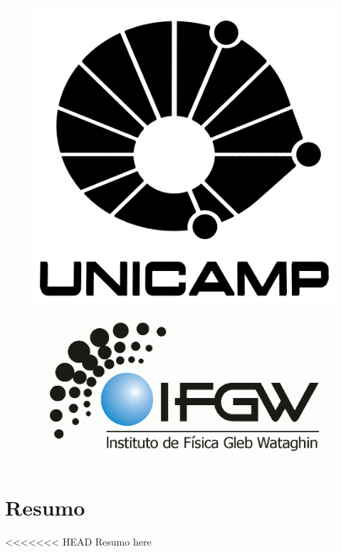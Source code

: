 \documentclass[a4paper]{article}
\begin{document}
\begin{figure}[!ht]
	\begin{minipage}[b]{0.45\linewidth}
	\includegraphics[scale=0.25]{logo-unicamp-name-line-blk-blk-0480.jpg}
	\end{minipage}
	\hspace{0.5cm}
	\begin{minipage}[b]{0.45\linewidth}
	\includegraphics[scale=0.25]{logo-ifgw.png}
	\end{minipage}
\end{figure}

\newpage

\section{Resumo}
<<<<<<< HEAD
Resumo here
\end{document}
